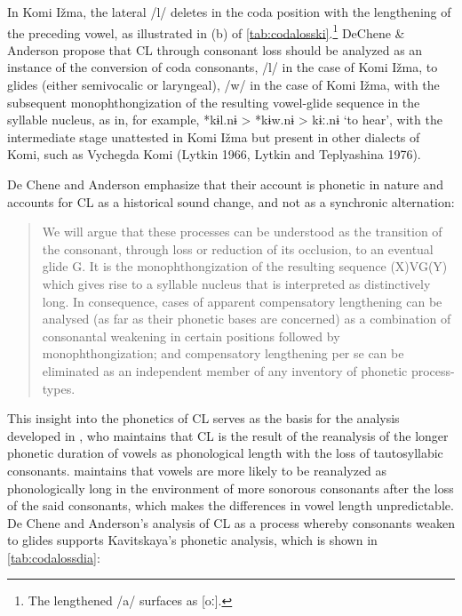 \documentclass[output=paper,
modfonts
]{LSP/langsci}
\begin{document}
In Komi Ižma, the lateral /l/ deletes in the coda position with the
lengthening of the preceding vowel, as illustrated in (b) of \cref{tab:codalosski}.\footnote{The
  lengthened /a/ surfaces as {[}oː{]}.} DeChene \& Anderson \citeyearpar{deChene1979}
propose that CL through consonant loss should be analyzed as an instance
of the conversion of coda consonants, /l/ in the case of Komi Ižma, to
glides (either semivocalic or laryngeal), /w/ in the case of Komi Ižma,
with the subsequent monophthongization of the resulting vowel-glide
sequence in the syllable nucleus, as in, for example, *kɨl.nɨ
\textgreater{} *kɨw.nɨ \textgreater{} kɨː.nɨ `to hear', with the
intermediate stage unattested in Komi Ižma but present in other dialects
of Komi, such as Vychegda Komi (Lytkin 1966, Lytkin and Teplyashina
1976).

De Chene and Anderson \citeyearpar[508]{deChene1979} emphasize that their account is
phonetic in nature and accounts for CL as a historical sound change, and
not as a synchronic alternation:

\begin{quote}
We will argue that these processes can be understood as the transition
of the consonant, through loss or reduction of its occlusion, to an
eventual glide G. It is the monophthongization of the resulting sequence
(X)VG(Y) which gives rise to a syllable nucleus that is interpreted as
distinctively long. In consequence, cases of apparent compensatory
lengthening can be analysed (as far as their phonetic bases are
concerned) as a combination of consonantal weakening in certain
positions followed by monophthongization; and compensatory lengthening
per se can be eliminated as an independent member of any inventory of
phonetic process-types.
\end{quote}

This insight into the phonetics of CL serves as the basis for the
analysis developed in \citet{kavitskaya2002}, who maintains that CL is the
result of the reanalysis of the longer phonetic duration of vowels as
phonological length with the loss of tautosyllabic consonants.
\citet{kavitskaya2002} maintains that vowels are more likely to be reanalyzed
as phonologically long in the environment of more sonorous consonants
after the loss of the said consonants, which makes the differences in
vowel length unpredictable. De Chene and Anderson's \citeyearpar{deChene1979} analysis of
CL as a process whereby consonants weaken to glides supports
Kavitskaya's phonetic analysis, which is shown in \cref{tab:codalossdia}:%
\end{document}
